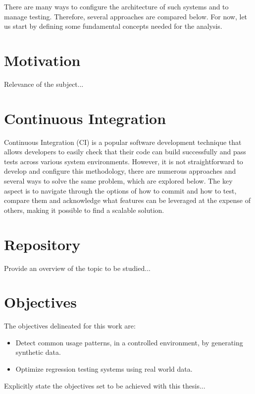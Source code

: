 There are many ways to configure the architecture of such systems and to manage testing. Therefore, several approaches are compared below. For now, let us start by defining some fundamental concepts needed for the analysis.




\section{Motivation}
\label{section:motivation}

Relevance of the subject...



\section{Continuous Integration }
\label{section:ci}

Continuous Integration (CI) is a popular software development technique that allows developers to easily check that their code can build successfully and pass tests across various system environments.\cite{santolucito2018statically} However, it is not straightforward to develop and configure this methodology, there are numerous approaches and several ways to solve the same problem, which are explored below. The key aspect is to navigate through the options of how to commit and how to test, compare them and acknowledge what features can be leveraged at the expense of others, making it possible to find a scalable solution.


\section{Repository}
\label{section:repository}

Provide an overview of the topic to be studied...


\section{Objectives}
\label{section:objectives}
The objectives delineated for this work are:
\begin{itemize}
	\item Detect common usage patterns, in a controlled environment, by generating synthetic data.
	\item Optimize regression testing systems using real world data.
\end{itemize}
Explicitly state the objectives set to be achieved with this thesis...



